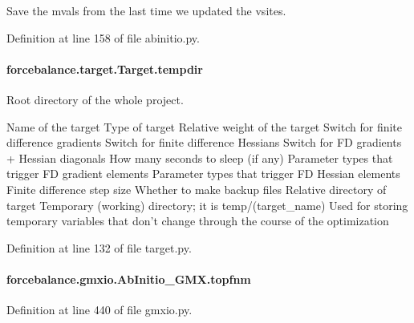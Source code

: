Save the mvals from the last time we updated the vsites. 



Definition at line 158 of file abinitio.\-py.

\hypertarget{classforcebalance_1_1target_1_1Target_aa1f01b5b78db253b5b66384ed11ed193}{
\paragraph[{tempdir}]{\setlength{\rightskip}{0pt plus 5cm}forcebalance.\-target.\-Target.\-tempdir\hspace{0.3cm}{\ttfamily [inherited]}}}\label{classforcebalance_1_1target_1_1Target_aa1f01b5b78db253b5b66384ed11ed193}


Root directory of the whole project. 

Name of the target Type of target Relative weight of the target Switch for finite difference gradients Switch for finite difference Hessians Switch for F\-D gradients + Hessian diagonals How many seconds to sleep (if any) Parameter types that trigger F\-D gradient elements Parameter types that trigger F\-D Hessian elements Finite difference step size Whether to make backup files Relative directory of target Temporary (working) directory; it is temp/(target\-\_\-name) Used for storing temporary variables that don't change through the course of the optimization 

Definition at line 132 of file target.\-py.

\hypertarget{classforcebalance_1_1gmxio_1_1AbInitio__GMX_a885b702e86cd8978df92fbdac8dd36e9}{
\paragraph[{topfnm}]{\setlength{\rightskip}{0pt plus 5cm}forcebalance.\-gmxio.\-Ab\-Initio\-\_\-\-G\-M\-X.\-topfnm}}\label{classforcebalance_1_1gmxio_1_1AbInitio__GMX_a885b702e86cd8978df92fbdac8dd36e9}


Definition at line 440 of file gmxio.\-py.

